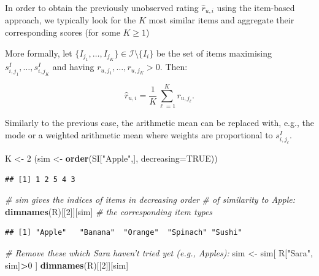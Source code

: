 \documentclass[10pt,b5paper,krantz1]{krantz}
\newenvironment{Shaded}{\begin{snugshade}}{\end{snugshade}}
\newcommand{\CommentTok}[1]{\textcolor[rgb]{0.37,0.37,0.37}{\textit{#1}}}
\newcommand{\DataTypeTok}[1]{\textcolor[rgb]{0.27,0.27,0.27}{#1}}
\newcommand{\DecValTok}[1]{\textcolor[rgb]{0.06,0.06,0.06}{#1}}
\newcommand{\KeywordTok}[1]{\textcolor[rgb]{0.27,0.27,0.27}{\textbf{#1}}}
\newcommand{\NormalTok}[1]{#1}
\newcommand{\OperatorTok}[1]{\textcolor[rgb]{0.43,0.43,0.43}{\textbf{#1}}}
\newcommand{\OtherTok}[1]{\textcolor[rgb]{0.37,0.37,0.37}{#1}}
\newcommand{\StringTok}[1]{\textcolor[rgb]{0.5,0.5,0.5}{#1}}
\providecommand{\tightlist}{%
  \setlength{\itemsep}{0pt}\setlength{\parskip}{0pt}}
\begin{document}
In order to obtain the previously unobserved
rating \(\hat{r}_{u,i}\) using the item-based approach, we typically
look for the \(K\) most similar items and aggregate their corresponding
scores (for some \(K\ge 1\))

More formally, let \(\{I_{j_1},\dots,I_{j_K}\}\in\mathcal{I}\setminus\{I_i\}\) be the set
of items maximising \(s^I_{i, j_1}, \dots, s^I_{i, j_K}\) and having \(r_{u, j_1},\dots,r_{u, j_K}>0\). Then:

\[
\hat{r}_{u,i} = \frac{1}{K} \sum_{\ell=1}^K r_{u, j_\ell}.
\]

\begin{description}
\tightlist
\item[Remark.]
Similarly to the previous case,
the arithmetic mean can be replaced with, e.g.,
the mode or
a weighted arithmetic mean where weights are proportional to \(s^I_{i, j_\ell}\).
\end{description}

\begin{Shaded}
\begin{Highlighting}[]
\NormalTok{K <-}\StringTok{ }\DecValTok{2}
\NormalTok{(sim <-}\StringTok{ }\KeywordTok{order}\NormalTok{(SI[}\StringTok{"Apple"}\NormalTok{,], }\DataTypeTok{decreasing=}\OtherTok{TRUE}\NormalTok{))}
\end{Highlighting}
\end{Shaded}

\begin{verbatim}
## [1] 1 2 5 4 3
\end{verbatim}

\begin{Shaded}
\begin{Highlighting}[]
\CommentTok{# sim gives the indices of items in decreasing order}
\CommentTok{# of similarity to Apple:}
\KeywordTok{dimnames}\NormalTok{(R)[[}\DecValTok{2}\NormalTok{]][sim] }\CommentTok{# the corresponding item types}
\end{Highlighting}
\end{Shaded}

\begin{verbatim}
## [1] "Apple"   "Banana"  "Orange"  "Spinach" "Sushi"
\end{verbatim}

\begin{Shaded}
\begin{Highlighting}[]
\CommentTok{# Remove these which Sara haven't tried yet (e.g., Apples):}
\NormalTok{sim <-}\StringTok{ }\NormalTok{sim[ R[}\StringTok{"Sara"}\NormalTok{, sim]}\OperatorTok{>}\DecValTok{0}\NormalTok{ ]}
\KeywordTok{dimnames}\NormalTok{(R)[[}\DecValTok{2}\NormalTok{]][sim]}
\end{Highlighting}
\end{Shaded}
\end{document}
